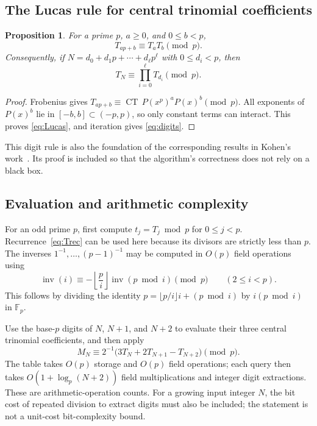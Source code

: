 \documentclass[11pt,a4paper]{article}
\numberwithin{equation}{section}
\newtheorem{proposition}[theorem]{Proposition}
\theoremstyle{definition}
\theoremstyle{remark}
\DeclareMathOperator{\CT}{CT}
\newcommand{\F}{\mathbb F}
\begin{document}
\subsection{The Lucas rule for central trinomial coefficients}
\begin{proposition}\label{prop:Lucas}
For a prime $p$, $a\geq0$, and $0\leq b<p$,
\begin{equation}\label{eq:Lucas}
 T_{ap+b}\equiv T_aT_b\pmod p.
\end{equation}
Consequently, if $N=d_0+d_1p+\cdots+d_\ell p^\ell$ with
$0\leq d_i<p$, then
\begin{equation}\label{eq:digits}
 T_N\equiv\prod_{i=0}^{\ell}T_{d_i}\pmod p.
\end{equation}
\end{proposition}
\begin{proof}
Frobenius gives
$T_{ap+b}\equiv\CT\,P(x^p)^aP(x)^b\pmod p$.
All exponents of $P(x)^b$ lie in $[-b,b]\subset(-p,p)$, so only
constant terms can interact. This proves \eqref{eq:Lucas}, and
iteration gives \eqref{eq:digits}.
\end{proof}
This digit rule is also the foundation of the corresponding results in
Kohen's work~\cite{kohenUniform,kohenDensity}. Its proof is included so
that the algorithm's correctness does not rely on a black box.

\subsection{Evaluation and arithmetic complexity}
For an odd prime $p$, first compute $t_j=T_j\bmod p$ for $0\leq j<p$.
Recurrence~\eqref{eq:Trec} can be used here because its divisors are
strictly less than $p$. The inverses $1^{-1},\ldots,(p-1)^{-1}$ may be
computed in $O(p)$ field operations using
\[
 \operatorname{inv}(i)\equiv
 -\left\lfloor\frac pi\right\rfloor\operatorname{inv}(p\bmod i)\pmod p
 \qquad(2\leq i<p).
\]
This follows by dividing the identity
$p=\lfloor p/i\rfloor i+(p\bmod i)$ by $i(p\bmod i)$ in $\F_p$.

Use the base-$p$ digits of $N$, $N+1$, and $N+2$ to evaluate their
three central trinomial coefficients, and then apply
\begin{equation}\label{eq:Mfast}
 M_N\equiv2^{-1}\bigl(3T_N+2T_{N+1}-T_{N+2}\bigr)\pmod p.
\end{equation}
The table takes $O(p)$ storage and $O(p)$ field operations; each query
then takes $O(1+\log_p(N+2))$ field multiplications and integer digit
extractions. These are arithmetic-operation counts. For a growing input
integer $N$, the bit cost of repeated division to extract digits must
also be included; the statement is not a unit-cost bit-complexity bound.
\end{document}
